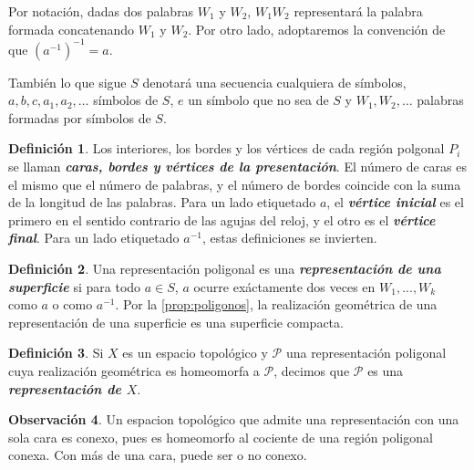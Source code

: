 \documentclass[10pt]{report}
\theoremstyle{definition}
\newtheorem{defin}{Definición}[section]
\newtheorem{obs}[defin]{Observación}
\begin{document}
Por notación, dadas dos palabras $W_1$ y $W_2$, $W_1W_2$ representará la palabra formada concatenando $W_1$ y $W_2$. Por otro lado, adoptaremos la convención de que $(a^{-1})^{-1}=a$.

También lo que sigue $S$ denotará una secuencia cualquiera de símbolos, $a,b,c,a_1,a_2,\dots$ símbolos de $S$, $e$ un símbolo que no sea de $S$ y $W_1, W_2, \dots$ palabras formadas por símbolos de $S$.

\begin{defin}%
Los interiores, los bordes y los vértices de cada región polgonal $P_i$ se llaman \textbf{\emph{caras, bordes y vértices de la presentación}}. El número de caras es el mismo que el número de palabras, y el número de bordes coincide con la suma de la longitud de las palabras.
Para un lado etiquetado $a$, el \textbf{\emph{vértice inicial}} es el primero en el sentido contrario de las agujas del reloj, y el otro es el \textbf{\emph{vértice final}}. Para un lado etiquetado $a^{-1}$, estas definiciones se invierten. 
\end{defin}

\begin{defin}%
Una representación poligonal es una \textbf{\emph{representación de una superficie}} si para todo $a\in S$, $a$ ocurre exáctamente dos veces en $W_1,...,W_k$ como $a$ o como $a^{-1}$.
Por la \autoref{prop:poligonos}, la realización geométrica de una representación de una superficie es una superficie compacta.
\end{defin}

\begin{defin}%
Si $X$ es un espacio topológico y $\mathcal{P}$ una representación poligonal cuya realización geométrica es homeomorfa a $\mathcal{P}$, decimos que $\mathcal{P}$ es una \textbf{\emph{representación de $X$}}.
\end{defin}

\begin{obs}%
Un espacion topológico que admite una representación con una sola cara es conexo, pues es homeomorfo al cociente de una región poligonal conexa. Con más de una cara, puede ser o no conexo.
\end{obs}
\end{document}
